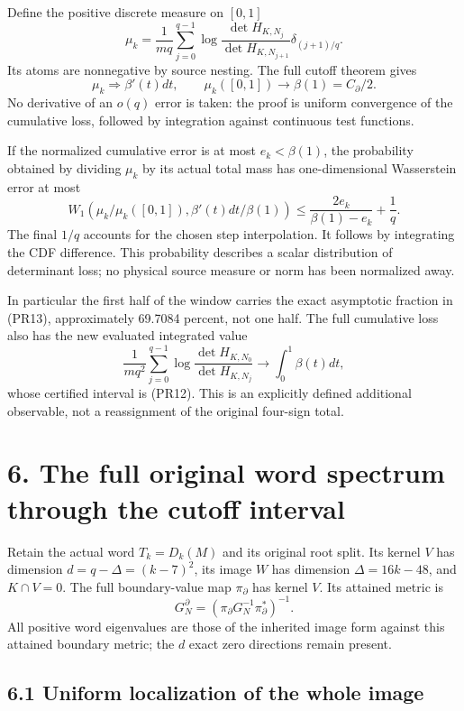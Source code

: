 \documentclass[10pt]{article}
\begin{document}
Define the positive discrete measure on \([0,1]\) \[
 \mu_k=\frac1{mq}\sum_{j=0}^{q-1}
 \log\frac{\det H_{K,N_j}}{\det H_{K,N_{j+1}}}
 \delta_{(j+1)/q}.
 \tag{SQ5}
\] Its atoms are nonnegative by source nesting. The full cutoff theorem gives \[
 \boxed{\mu_k\Rightarrow\beta'(t)dt,
 \qquad\mu_k([0,1])\to\beta(1)=C_\partial/2.}
 \tag{SQ6}
\] No derivative of an \(o(q)\) error is taken: the proof is uniform convergence of the cumulative loss, followed by integration against continuous test functions.

If the normalized cumulative error is at most \(e_k<\beta(1)\), the probability obtained by dividing \(\mu_k\) by its actual total mass has one-dimensional Wasserstein error at most \[
 \boxed{W_1\left(\mu_k/\mu_k([0,1]),
 \beta'(t)dt/\beta(1)\right)
 \le\frac{2e_k}{\beta(1)-e_k}+\frac1q.}
 \tag{SQ7}
\] The final \(1/q\) accounts for the chosen step interpolation. It follows by integrating the CDF difference. This probability describes a scalar distribution of determinant loss; no physical source measure or norm has been normalized away.

In particular the first half of the window carries the exact asymptotic fraction in (PR13), approximately 69.7084 percent, not one half. The full cumulative loss also has the new evaluated integrated value \[
 \boxed{\frac1{mq^2}\sum_{j=0}^{q-1}
 \log\frac{\det H_{K,N_0}}{\det H_{K,N_j}}
 \longrightarrow\int_0^1\beta(t)dt,}
 \tag{SQ8}
\] whose certified interval is (PR12). This is an explicitly defined additional observable, not a reassignment of the original four-sign total.

\section{6. The full original word spectrum through the cutoff interval}\label{the-full-original-word-spectrum-through-the-cutoff-interval}

Retain the actual word \(T_k=D_k(M)\) and its original root split. Its kernel \(V\) has dimension \(d=q-\Delta=(k-7)^2\), its image \(W\) has dimension \(\Delta=16k-48\), and \(K\cap V=0\). The full boundary-value map \(\pi_\partial\) has kernel \(V\). Its attained metric is \[
 G_N^\partial=(\pi_\partial G_N^{-1}\pi_\partial^*)^{-1}.
\] All positive word eigenvalues are those of the inherited image form against this attained boundary metric; the \(d\) exact zero directions remain present.

\subsection{6.1 Uniform localization of the whole image}\label{uniform-localization-of-the-whole-image}
\end{document}
